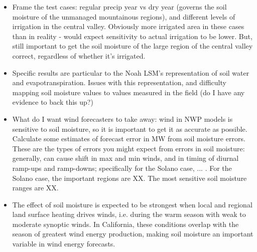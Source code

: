 \documentclass[12pt]{amsart}
\begin{document}
\begin{itemize}
\item Frame the test cases: regular precip year vs dry year (governs the soil moisture of the unmanaged mountainous regions), and different levels of irrigation in the central valley.  Obviously more irrigated area in these cases than in reality - would expect sensitivity to actual irrigation to be lower.  But, still important to get the soil moisture of the large region of the central valley correct, regardless of whether it's irrigated.
\item Specific results are particular to the Noah LSM's representation of soil water and evapotranspiration.  Issues with this representation, and difficulty mapping soil moisture values to values measured in the field (do I have any evidence to back this up?)
\item What do I want wind forecasters to take away: wind in NWP models is sensitive to soil moisture, so it is important to get it as accurate as possible.  Calculate some estimates of forecast error in MW from soil moisture errors.  These are the types of errors you might expect from errors in soil moisture: generally, can cause shift in max and min winds, and in timing of diurnal ramp-ups and ramp-downs; specifically for the Solano case, ... .  For the Solano case, the important regions are XX.  The most sensitive soil moisture ranges are XX.  
\item The effect of soil moisture is expected to be strongest when local and regional land surface heating drives winds, i.e. during the warm season with weak to moderate synoptic winds.  In California, these conditions overlap with the season of greatest wind energy production, making soil moisture an important variable in wind energy forecasts.
\end{itemize}
\end{document}
